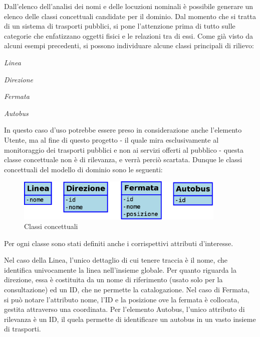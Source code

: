 Dall'elenco dell'analisi dei nomi e delle locuzioni nominali è possibile generare un elenco delle classi concettuali candidate per il dominio. Dal momento che si tratta di un sistema di trasporti pubblici, si pone l'attenzione prima di tutto sulle categorie che enfatizzano oggetti fisici e le relazioni tra di essi.
Come già visto da alcuni esempi precedenti, si possono individuare alcune classi principali di rilievo:

{\itshape Linea}

{\itshape Direzione}

{\itshape Fermata}

{\itshape Autobus}

In questo caso d'uso potrebbe essere preso in considerazione anche l'elemento Utente, ma al fine di questo progetto - il quale mira esclusivamente al monitoraggio dei trasporti pubblici e non ai servizi offerti al pubblico - questa classe concettuale non è di rilevanza, e verrà perciò scartata.
Dunque le classi concettuali del modello di dominio sono le seguenti:

\begin{figure}[htbp]
\begin{center}
\includegraphics[width=10cm]{contents/images/classi_concettuali}
\end{center}
\caption{Classi concettuali}
\label{fig:classes}
\end{figure}

\newpage
Per ogni classe sono stati definiti anche i corrispettivi attributi d'interesse.

Nel caso della Linea, l'unico dettaglio di cui tenere traccia è il nome, che identifica univocamente la linea nell'insieme globale. Per quanto riguarda la direzione, essa è costituita da un nome di riferimento (usato solo per la consultazione) ed un ID, che ne permette la catalogazione.
Nel caso di Fermata, si può notare l'attributo nome, l'ID e la posizione ove la fermata è collocata, gestita attraverso una coordinata.
Per l'elemento Autobus, l'unico attributo di rilevanza è un ID, il quela permette di identificare un autobus in un vasto insieme di trasporti.

